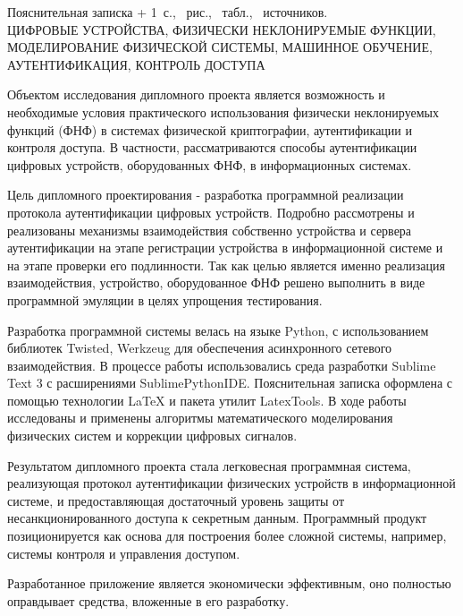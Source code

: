 
\newcommand{\totpages}{\number\numexpr{} + 1}

\begin{center}
    Пояснительная записка \totpages~с., \totfig{}~рис., \tottab{}~табл., \totref{}~источников.
    \\
    \MakeUppercase{цифровые устройства, физически неклонируемые функции, моделирование физической системы, машинное обучение, аутентификация, контроль доступа}
\end{center}

Объектом исследования дипломного проекта является возможность и необходимые условия практического использования физически неклонируемых функций (ФНФ) в системах физической криптографии, аутентификации и контроля доступа. В частности, рассматриваются способы аутентификации цифровых устройств, оборудованных ФНФ, в информационных системах.

Цель дипломного проектирования - разработка программной реализации протокола аутентификации цифровых устройств. Подробно рассмотрены и реализованы механизмы взаимодействия собственно устройства и сервера аутентификации на этапе регистрации устройства в информационной системе и на этапе проверки его подлинности.
Так как целью является именно реализация взаимодействия, устройство, оборудованное ФНФ решено выполнить в виде программной эмуляции в целях упрощения тестирования.

Разработка программной системы велась на языке Python, с использованием библиотек Twisted, Werkzeug для обеспечения асинхронного сетевого взаимодействия. В процессе работы использовались среда разработки Sublime Text 3 с расширениями SublimePythonIDE. Пояснительная записка оформлена с помощью технологии LaTeX и пакета утилит LatexTools. В ходе работы исследованы и применены алгоритмы математического моделирования физических систем и коррекции цифровых сигналов.

Результатом дипломного проекта стала легковесная программная система, реализующая протокол аутентификации физических устройств в информационной системе, и предоставляющая достаточный уровень защиты от несанкционированного доступа к секретным данным. Программный продукт позиционируется как основа для построения более сложной системы, например, системы контроля и управления доступом.

Разработанное приложение является экономически эффективным, оно полностью оправдывает средства, вложенные в его разработку.

\clearpage